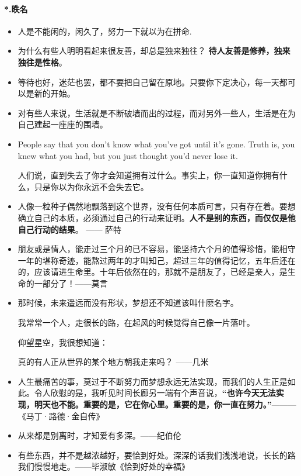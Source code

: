 \documentclass[UTF8,a4paper,8pt]{ctexbook}
\begin{document}
	\paragraph{*.昳名}
	\begin{itemize}
		\item  人是不能闲的，闲久了，努力一下就以为在拼命.
		\item  为什么有些人明明看起来很友善，却总是独来独往？\textbf{ 待人友善是修养，独来独往是性格}。
		\item  等待也好，迷茫也罢，都不要把自己留在原地。只要你下定决心，每一天都可以是新的开始。
		\item  对有些人来说，生活就是不断破墙而出的过程，而对另外一些人，生活是在为自己建起一座座的围墙。
		\item  People say that you don't know what you've got until it's gone. Truth is, you knew what you had, but you just thought you'd never lose it. 
		
		人们说，直到失去了你才会知道拥有过什么。事实上，你一直知道你拥有什么，只是你以为你永远不会失去它。
		\item  人像一粒种子偶然地飘落到这个世界，没有任何本质可言，只有存在着。要想确立自己的本质，必须通过自己的行动来证明。\textbf{人不是别的东西，而仅仅是他自己行动的结果}。 —— 萨特 
		
		\item 朋友或是情人，能走过三个月的已不容易，能坚持六个月的值得珍惜，能相守一年的堪称奇迹，能熬过两年的才叫知己，超过三年的值得记忆，五年后还在的，应该请进生命里。十年后依然在的，那就不是朋友了，已经是亲人，是生命的一部分了！——莫言
		
		\item 那时候，未来遥远而没有形状，梦想还不知道该叫什麽名字。
		
		我常常一个人，走很长的路，在起风的时候觉得自己像一片落叶。
		
		仰望星空，我很想知道：
		
		真的有人正从世界的某个地方朝我走来吗？
		——几米
		
		\item 人生最痛苦的事，莫过于不断努力而梦想永远无法实现，而我们的人生正是如此。令人欣慰的是，我听见时间长廊另一端有个声音说，\textbf{“也许今天无法实现，明天也不能。重要的是，它在你心里。重要的是，你一直在努力。”}———《马丁·路德·金自传》
		
		\item 从来都是别离时，才知爱有多深。——纪伯伦
		
		\item 有些东西，并不是越浓越好，要恰到好处。深深的话我们浅浅地说，长长的路我们慢慢地走。——毕淑敏《恰到好处的幸福》
		

\end{itemize}
\end{document}
